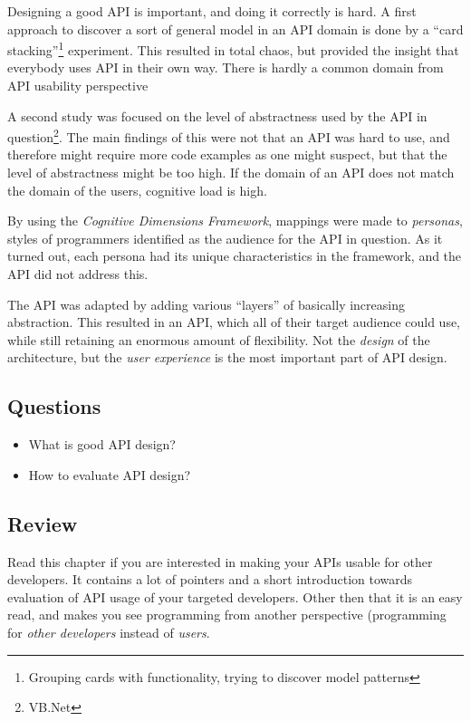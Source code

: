 Designing a good API is important, and doing it correctly is hard. 
A first approach to discover a sort of general model in an API domain is done by a ``card stacking''\footnote{Grouping cards with functionality, trying to discover model patterns} experiment.
This resulted in total chaos, but provided the insight that everybody uses API in their own way. 
There is hardly a common domain from API usability perspective

A second study was focused on the level of abstractness used by the API in question\footnote{VB.Net}.
The main findings of this were not that an API was hard to use, and therefore might require more code examples as one might suspect, but that the level of abstractness might be too high.
If the domain of an API does not match the domain of the users, cognitive load is high.

By using the \emph{Cognitive Dimensions Framework}, mappings were made to \emph{personas}, styles of programmers identified as the audience for the API in question.
As it turned out, each persona had its unique characteristics in the framework, and the API did not address this.

The API was adapted by adding various ``layers'' of basically increasing abstraction. 
This resulted in an API, which all of their target audience could use, while still retaining an enormous amount of flexibility. Not the \emph{design} of the architecture, but the \emph{user experience} is the most important part of API design.

\subsection{Questions}
\begin{itemize}
  \item What is good API design?
  \item How to evaluate API design?
\end{itemize}

\subsection{Review}
Read this chapter if you are interested in making your APIs usable for other developers. 
It contains a lot of pointers and a short introduction towards evaluation of API usage of your targeted developers. 
Other then that it is an easy read, and makes you see programming from another perspective (programming for \emph{other developers} instead of \emph{users}.

